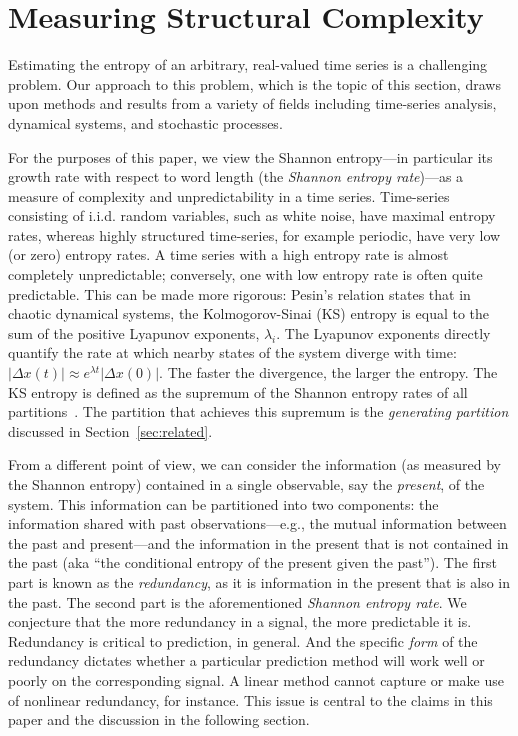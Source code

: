 \section{Measuring Structural Complexity }\label{sec:meaComplex}


Estimating the entropy of an arbitrary, real-valued time series is a
challenging problem.  Our approach to this problem, which is the topic
of this section, draws upon methods and results from a variety of
fields including time-series analysis, dynamical systems, and
stochastic processes.

For the purposes of this paper, we view the Shannon entropy---in
particular its growth rate with respect to word length (the
\emph{Shannon entropy rate})---as a measure of complexity and
unpredictability in a time series.  Time-series consisting of i.i.d.
random variables, such as white noise, have maximal entropy rates,
whereas highly structured time-series, for example periodic, have very
low (or zero) entropy rates. A time series with a high entropy rate is
almost completely unpredictable; conversely, one with low entropy rate
is often quite predictable. This can be made more rigorous: Pesin's
relation \cite{pesin77} states that in chaotic dynamical systems, the
Kolmogorov-Sinai (KS) entropy is equal to the sum of the positive
Lyapunov exponents, $\lambda_i$.  The Lyapunov exponents directly
quantify the rate at which nearby states of the system diverge with
time: $\left| \Delta x(t) \right| \approx e^{\lambda t} \left| \Delta
x(0) \right|$.  The faster the divergence, the larger the entropy.
The KS entropy is defined as the supremum of the Shannon entropy rates
of all partitions~\cite{petersen1989}. The partition that achieves
this supremum is the \emph{generating partition} discussed in
Section~\ref{sec:related}.

From a different point of view, we can consider the information (as
measured by the Shannon entropy) contained in a single observable, say
the \emph{present}, of the system. This information can be partitioned
into two components: the information shared with past
observations---e.g., the mutual information between the past and
present---and the information in the present that is not contained in
the past (aka ``the conditional entropy of the present given the
past'').  The first part is known as the \emph{redundancy}, as it is
information in the present that is also in the past.  The second part
is the aforementioned \emph{Shannon entropy rate}.  We conjecture that 
the more redundancy in a signal, the more predictable it is.  
Redundancy is critical to prediction, in general.  And the specific 
\emph{form} of the redundancy dictates whether a particular prediction 
method will work well or poorly on the corresponding signal.  A linear 
method cannot capture or make use of nonlinear redundancy, for 
instance.  This issue is central to the claims in this paper and the 
discussion in the following section.

